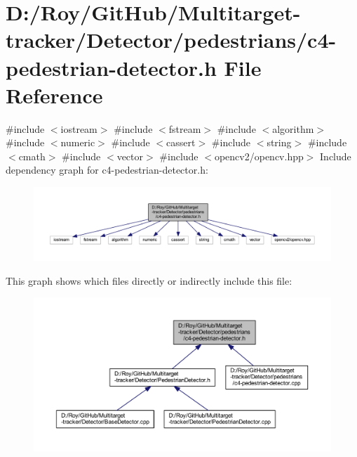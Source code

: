 \hypertarget{c4-pedestrian-detector_8h}{}\section{D\+:/\+Roy/\+Git\+Hub/\+Multitarget-\/tracker/\+Detector/pedestrians/c4-\/pedestrian-\/detector.h File Reference}
\label{c4-pedestrian-detector_8h}
{\ttfamily \#include $<$iostream$>$}\newline
{\ttfamily \#include $<$fstream$>$}\newline
{\ttfamily \#include $<$algorithm$>$}\newline
{\ttfamily \#include $<$numeric$>$}\newline
{\ttfamily \#include $<$cassert$>$}\newline
{\ttfamily \#include $<$string$>$}\newline
{\ttfamily \#include $<$cmath$>$}\newline
{\ttfamily \#include $<$vector$>$}\newline
{\ttfamily \#include $<$opencv2/opencv.\+hpp$>$}\newline
Include dependency graph for c4-\/pedestrian-\/detector.h\+:\nopagebreak
\begin{figure}[H]
\begin{center}
\leavevmode
\includegraphics[width=350pt]{c4-pedestrian-detector_8h__incl}
\end{center}
\end{figure}
This graph shows which files directly or indirectly include this file\+:\nopagebreak
\begin{figure}[H]
\begin{center}
\leavevmode
\includegraphics[width=350pt]{c4-pedestrian-detector_8h__dep__incl}
\end{center}
\end{figure}

